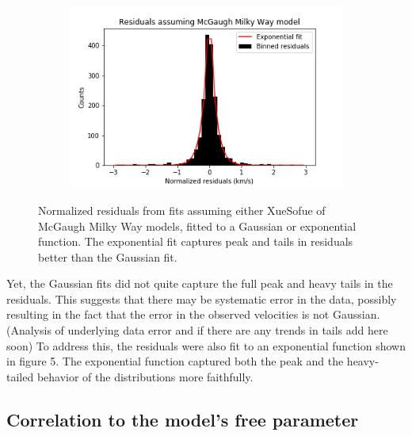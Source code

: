 \documentclass[reprint,%
 amsmath,amssymb,
 aps,
]{revtex4-1}
\begin{document}
\begin{figure}[h]
\begin{subfigure}[b]{0.475\textwidth}
         \label{fig:XueSofue residuals exponential fit}
     \end{subfigure}
     \begin{subfigure}[b]{0.475\textwidth}
         \centering
         \includegraphics[width=.8\linewidth]{figures/ResidualHist_ExpFit_v1_sinh_v2_cosh_McGaugh.png}
         \label{fig:McGaugh residuals exponential fit}
     \end{subfigure}
        \caption{Normalized residuals from fits assuming either XueSofue of McGaugh Milky Way models, fitted to a Gaussian or exponential function. The exponential fit captures peak and tails in residuals better than the Gaussian fit.}
        \label{fig:residual graphs}
\end{figure}
Yet, the Gaussian fits did not quite capture the full peak and heavy tails in the residuals. This suggests that there may be systematic error in the data, possibly resulting in the fact that the error in the observed velocities is not Gaussian.(Analysis of underlying data error and if there are any trends in tails add here soon) To address this, the residuals were also fit to an exponential function shown in figure 5. The exponential function captured both the peak and the heavy-tailed behavior of the distributions more faithfully.

\subsection{Correlation to  the model's free parameter }
\end{document}
